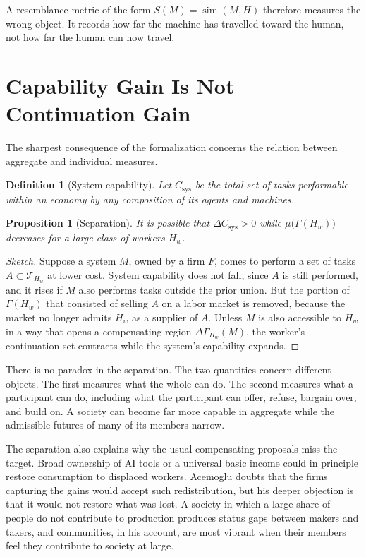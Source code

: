 \documentclass[11pt]{article}
\newtheorem{definition}{Definition}
\newtheorem{proposition}{Proposition}
\begin{document}
A resemblance metric of the form $S(M) = \operatorname{sim}(M, H)$ therefore measures the wrong object. It records how far the machine has travelled toward the human, not how far the human can now travel.

\section{Capability Gain Is Not Continuation Gain}

The sharpest consequence of the formalization concerns the relation between aggregate and individual measures.

\begin{definition}[System capability]
Let $C_{\mathrm{sys}}$ be the total set of tasks performable within an economy by any composition of its agents and machines.
\end{definition}

\begin{proposition}[Separation]
It is possible that $\Delta C_{\mathrm{sys}} > 0$ while $\mu\big(\Gamma(H_w)\big)$ decreases for a large class of workers $H_w$.
\end{proposition}

\begin{proof}[Sketch]
Suppose a system $M$, owned by a firm $F$, comes to perform a set of tasks $A \subset \mathcal{T}_{H_w}$ at lower cost. System capability does not fall, since $A$ is still performed, and it rises if $M$ also performs tasks outside the prior union. But the portion of $\Gamma(H_w)$ that consisted of selling $A$ on a labor market is removed, because the market no longer admits $H_w$ as a supplier of $A$. Unless $M$ is also accessible to $H_w$ in a way that opens a compensating region $\Delta\Gamma_{H_w}(M)$, the worker's continuation set contracts while the system's capability expands.
\end{proof}

There is no paradox in the separation. The two quantities concern different objects. The first measures what the whole can do. The second measures what a participant can do, including what the participant can offer, refuse, bargain over, and build on. A society can become far more capable in aggregate while the admissible futures of many of its members narrow.

The separation also explains why the usual compensating proposals miss the target. Broad ownership of AI tools or a universal basic income could in principle restore consumption to displaced workers. Acemoglu doubts that the firms capturing the gains would accept such redistribution, but his deeper objection is that it would not restore what was lost. A society in which a large share of people do not contribute to production produces status gaps between makers and takers, and communities, in his account, are most vibrant when their members feel they contribute to society at large.
\end{document}
